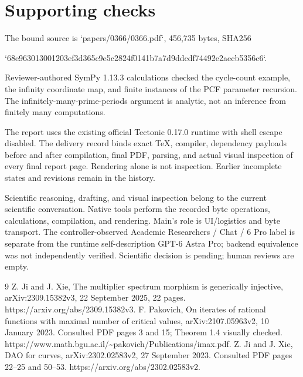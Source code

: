 \documentclass[10pt]{article}
\begin{document}
\section*{Supporting checks}
The bound source is `papers/0366/0366.pdf`, 456,735 bytes, SHA256\par
`68e963013001203ef3d365c9e5c2824f0141b7a7d9ddcdf74492e2aecb5356c6`.\par
Reviewer-authored SymPy 1.13.3 calculations checked the cycle-count example, the infinity coordinate map, and finite instances of the PCF parameter recursion. The infinitely-many-prime-periods argument is analytic, not an inference from finitely many computations.\par
The report uses the existing official Tectonic 0.17.0 runtime with shell escape disabled. The delivery record binds exact TeX, compiler, dependency payloads before and after compilation, final PDF, parsing, and actual visual inspection of every final report page. Rendering alone is not inspection. Earlier incomplete states and revisions remain in the history.\par
Scientific reasoning, drafting, and visual inspection belong to the current scientific conversation. Native tools perform the recorded byte operations, calculations, compilation, and rendering. Main’s role is UI/logistics and byte transport. The controller-observed Academic Researchers / Chat / 6 Pro label is separate from the runtime self-description GPT-6 Astra Pro; backend equivalence was not independently verified. Scientific decision is pending; human reviews are empty.\par
9 Z. Ji and J. Xie, The multiplier spectrum morphism is generically injective, arXiv:2309.15382v3, 22 September 2025, 22 pages. https://arxiv.org/abs/2309.15382v3. F. Pakovich, On iterates of rational functions with maximal number of critical values, arXiv:2107.05963v2, 10 January 2023. Consulted PDF pages 3 and 15; Theorem 1.4 visually checked. https://www.math.bgu.ac.il/\textasciitilde{}pakovich/Publications/imax.pdf. Z. Ji and J. Xie, DAO for curves, arXiv:2302.02583v2, 27 September 2023. Consulted PDF pages 22–25 and 50–53. https://arxiv.org/abs/2302.02583v2.\par
\end{document}
